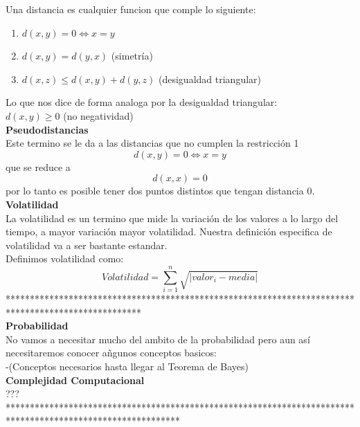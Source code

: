 \documentclass[12pt, letterpaper, twoside]{article}
\begin{document}
		Una distancia es cualquier funcion que comple lo siguiente:\\
			\begin{enumerate}
			\item $d(x,y) = 0 \iff x = y $
			\item $d(x,y) =d(y,x)$ (simetría)
			\item $d(x,z) \leq d(x,y) + d(y,z)$ (desigualdad triangular)
			\end{enumerate}
			Lo que nos dice de forma analoga por la desigualdad triangular:\\
			$d(x,y)\geq 0$ (no negatividad)\\
		{\textbf{Pseudodistancias}}\\
			Este termino se le da a las distancias que no cumplen la restricción 1 \[d(x,y) = 0 \iff x = y\]  que se reduce a \[d(x,x) = 0\] por lo tanto es posible tener dos puntos distintos que tengan distancia 0.
		{\textbf{Volatilidad}}\\
		La volatilidad es un termino que mide la variación de los valores a lo largo del tiempo, a mayor variación mayor volatilidad. Nuestra definición especifica de volatilidad va a ser bastante estandar.\\
		Definimos volatilidad como:\\
		\[Volatilidad = \sum_{i=1}^{n} \sqrt{\left | valor_i - media \right |} \]
****************************************************************************************************\\
		{\textbf{Probabilidad}}\\
		No vamos a necesitar mucho del ambito de la probabilidad pero aun así necesitaremos conocer añgunos conceptos basicos:\\
		-(Conceptos necesarios hasta llegar al Teorema de Bayes)\\
		
		{\textbf{Complejidad Computacional }}\\
		???\\
************************************************************************************************************\\
	\vspace{1cm}
\end{document}
